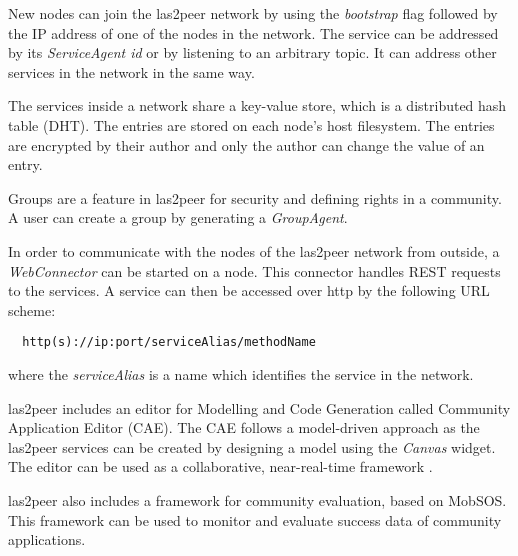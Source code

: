 New nodes can join the las2peer network by using the \emph{bootstrap} flag followed by the IP address of one of the nodes in the network. The service can be addressed by its \emph{ServiceAgent id}  or by listening to an arbitrary topic. It can address other services in the network in the same way. 

The services inside a network share a key-value store, which is a distributed hash table (DHT). The entries are stored on each node's host filesystem. The entries are encrypted by their author and only the author can change the value of an entry.


Groups are a feature in las2peer for security and defining rights in a community. 
A user can create a group by generating a \emph{GroupAgent}. 

In order to communicate with the nodes of the las2peer network from outside, a \emph{WebConnector} can be started on a node. This connector handles REST requests to the services. A service can then be accessed over http by the following URL scheme: 
\begin{lstlisting}
  http(s)://ip:port/serviceAlias/methodName
\end{lstlisting}
where the \emph{serviceAlias} is a name which identifies the service in the network. 

las2peer includes an editor for Modelling and Code Generation called Community Application Editor (CAE). 
The CAE follows a model-driven approach as the  las2peer services can be created by designing a model using the \emph{Canvas} widget. The editor can be used as a collaborative, near-real-time framework \cite{dND*16}. 

las2peer also includes a framework for community evaluation, based on MobSOS. This framework can be used to monitor and evaluate success data of community applications.

